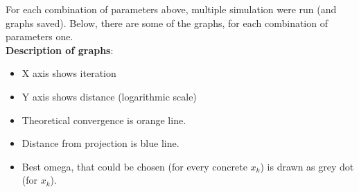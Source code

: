 \documentclass[11pt]{book}
\begin{document}
For each combination of parameters above, multiple simulation were run (and graphs saved). Below, there are some of the graphs, for each combination of parameters one.\\

\newpage
\textbf{Description of graphs}:
\begin{itemize}[noitemsep]
	\item X axis shows iteration
	\item Y axis shows distance (logarithmic scale)
	\item Theoretical convergence is orange line.
	\item Distance from projection is blue line.
	\item Best omega, that could be chosen (for every concrete $x_k$) is drawn as grey dot (for $x_k$).
\end{itemize}
\end{document}
